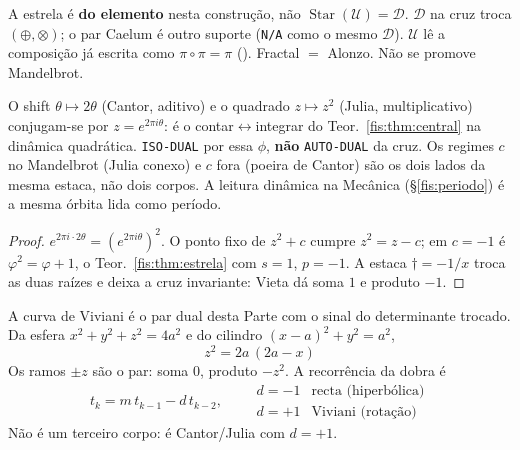 \documentclass[livro.tex]{subfiles}
\begin{document}
\noindent A estrela é \textbf{do elemento} nesta construção, não
\(\operatorname{Star}(\mathcal{U})=\mathcal{D}\). \(\mathcal{D}\) na cruz
troca \((\oplus,\otimes)\); o par Caelum é outro suporte
(\texttt{N/A} como o mesmo \(\mathcal{D}\)).
\(\mathcal{U}\) lê a composição já escrita como \(\pi\circ\pi=\pi\)
(). Fractal \(=\) Alonzo. Não se promove
Mandelbrot.

\begin{teorema}\label{fis:thm:alonzo-par}
O shift \(\theta\mapsto 2\theta\) (Cantor, aditivo) e o quadrado
\(z\mapsto z^{2}\) (Julia, multiplicativo) conjugam-se por
\(z=e^{2\pi i\theta}\): é o contar\(\leftrightarrow\)integrar do
Teor.~\ref{fis:thm:central} na dinâmica quadrática.
\texttt{ISO-DUAL} por essa \(\phi\), \textbf{não} \texttt{AUTO-DUAL} da
cruz. Os regimes \(c\) no Mandelbrot (Julia conexo) e \(c\) fora
(poeira de Cantor) são os dois lados da mesma estaca, não dois corpos.
A leitura dinâmica na Mecânica (§\ref{fis:periodo}) é a mesma órbita
lida como período.
\end{teorema}

\begin{proof}
\(e^{2\pi i\cdot 2\theta}=(e^{2\pi i\theta})^{2}\). O ponto fixo de
\(z^{2}+c\) cumpre \(z^{2}=z-c\); em \(c=-1\) é \(\varphi^{2}=\varphi+1\),
o Teor.~\ref{fis:thm:estrela} com \(s=1\), \(p=-1\). A estaca
\(\dagger=-1/x\) troca as duas raízes e deixa a cruz invariante: Vieta
dá soma \(1\) e produto \(-1\).
\end{proof}


\begin{teorema}\label{fis:thm:viviani}
A curva de Viviani é o par dual desta Parte com o sinal do
determinante trocado. Da esfera \(x^{2}+y^{2}+z^{2}=4a^{2}\) e do
cilindro \((x-a)^{2}+y^{2}=a^{2}\),
\[
\boxed{\;z^{2}=2a\,(2a-x)\;}
\]
Os ramos \(\pm z\) são o par: soma \(0\), produto \(-z^{2}\). A
recorrência da dobra é
\[
t_k=m\,t_{k-1}-d\,t_{k-2},
\qquad
\begin{array}{ll}
d=-1 & \text{recta (hiperbólica)}\\
d=+1 & \text{Viviani (rotação)}
\end{array}
\]
Não é um terceiro corpo: é Cantor/Julia com \(d=+1\).
\end{teorema}
\end{document}
